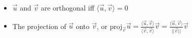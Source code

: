 \documentclass[12pt]{article}
\begin{document}
\begin{itemize}
\begin{enumerate}
    \end{enumerate}

  \item $\overrightarrow{u}$ and $\overrightarrow{v}$ are orthogonal iff $\langle\overrightarrow{u},\overrightarrow{v}\rangle=0$

  \item The projection of $\overrightarrow{u}$ onto $\overrightarrow{v}$, or proj$_{\overrightarrow{v}}\overrightarrow{u}=\frac{\langle\overrightarrow{u},\overrightarrow{v}\rangle}{\langle\overrightarrow{v},\overrightarrow{v}\rangle}\overrightarrow{v}=\frac{\langle\overrightarrow{u},\overrightarrow{v}\rangle}{||\overrightarrow{v}||}\overrightarrow{v}$

\end{itemize}
\end{document}
